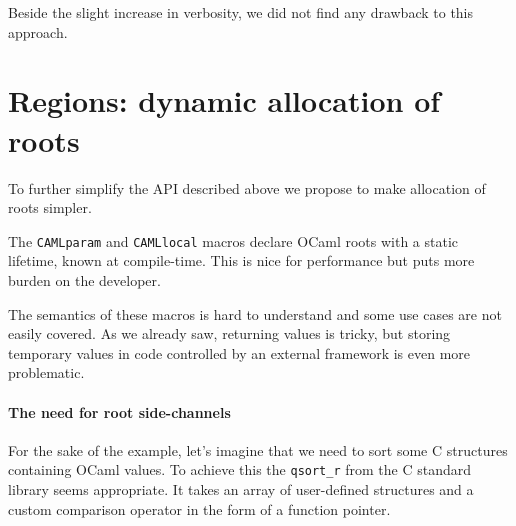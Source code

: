 \documentclass[a4paper]{easychair}
\begin{document}
Beside the slight increase in verbosity, we did not find any drawback to
this approach.

\hypertarget{regions-dynamic-allocation-of-roots}{%
\section{Regions: dynamic allocation of
roots}\label{regions-dynamic-allocation-of-roots}}

To further simplify the API described above we propose to make
allocation of roots simpler.

The \texttt{CAMLparam} and \texttt{CAMLlocal} macros declare OCaml roots
with a static lifetime, known at compile-time. This is nice for
performance but puts more burden on the developer.

The semantics of these macros is hard to understand and some use cases
are not easily covered. As we already saw, returning values is tricky,
but storing temporary values in code controlled by an external framework
is even more problematic.

\hypertarget{the-need-for-root-side-channels}{%
\paragraph{The need for root
side-channels}\label{the-need-for-root-side-channels}}

For the sake of the example, let's imagine that we need to sort some C
structures containing OCaml values. To achieve this the
\texttt{qsort\_r} from the C standard library seems appropriate. It
takes an array of user-defined structures and a custom comparison
operator in the form of a function pointer.

\begin{Shaded}
\begin{Highlighting}[]
\NormalTok{\};}

 
  
\NormalTok{\{}
 
 
\NormalTok{\}}

\NormalTok{\{}
\NormalTok{(}
\NormalTok{\}}
\end{Highlighting}
\end{Shaded}
\end{document}
